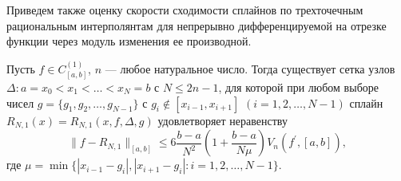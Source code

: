 Приведем также оценку скорости сходимости сплайнов по трехточечным рациональным
 интерполянтам для непрерывно дифференцируемой на отрезке функции через модуль изменения ее производной.

\begin{theorem}\label{rarkteor2.4}
Пусть $f\in C^{(1)}_{[a,b]}$, $n$ --- любое натуральное число. Тогда существует сетка узлов
$\Delta: a=x_0<x_1<\dots<x_N=b$ с $N\leqslant 2n-1$, для которой при любом выборе чисел
$g=\{g_1,g_2,\dots,g_{N-1}\}$ с $g_i\not \in [x_{i-1}, x_{i+1}]$ $(i=1,2,\dots,N-1)$ сплайн
$R_{N,1}(x)=R_{N,1} (x, f, \Delta, g)$ удовлетворяет неравенству
\begin{equation}\label{rark2.16}
\|f-R_{N,1}\|_{[a,b]}\leqslant 6\frac{b-a}{N^2} \left(1+\frac{b-a}{N\mu}\right)
V_n(f^\prime,[a,b]),
\end{equation}
где $\mu=\min\{|x_{i-1}-g_i|, |x_{i+1}-g_i|: i=1,2,\dots,N-1\}.$
\end{theorem}